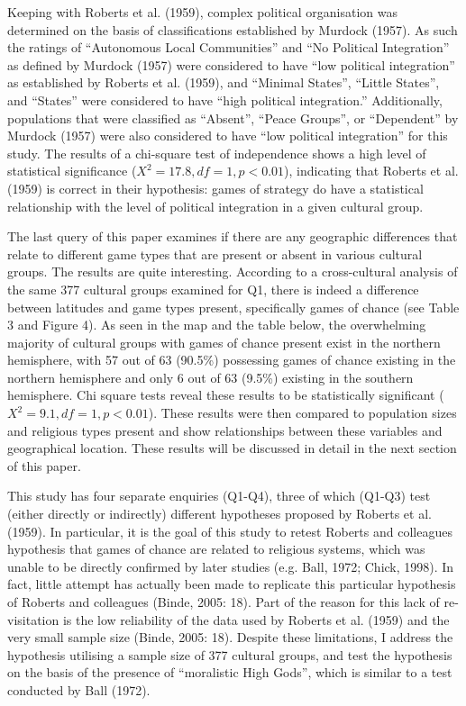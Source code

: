 \documentclass[%
	]{ijsra}
\begin{document}

Keeping with Roberts et al. (1959), complex political organisation was determined on the basis of classifications established by Murdock (1957). As such the ratings of “Autonomous Local Communities” and “No Political Integration” as defined by Murdock (1957) were considered to have “low political integration” as established by Roberts et al. (1959), and “Minimal States”, “Little States”, and “States” were considered to have “high political integration.” Additionally, populations that were classified as “Absent”, “Peace Groups”, or “Dependent” by Murdock (1957) were also considered to have “low political integration” for this study. The results of a chi-square test of independence shows a high level of statistical significance ($X^{2} = 17.8, df = 1, p < 0.01$), indicating that Roberts et al. (1959) is correct in their hypothesis: games of strategy do have a statistical relationship with the level of political integration in a given cultural group.


The last query of this paper examines if there are any geographic differences that relate to different game types that are present or absent in various cultural groups. The results are quite interesting. According to a cross-cultural analysis of the same 377 cultural groups examined for Q1, there is indeed a difference between latitudes and game types present, specifically games of chance (see Table 3 and Figure 4). As seen in the map and the table below, the overwhelming majority of cultural groups with games of chance present exist in the northern hemisphere, with 57 out of 63 (90.5\%) possessing games of chance existing in the northern hemisphere and only 6 out of 63 (9.5\%) existing in the southern hemisphere. Chi square tests reveal these results to be statistically significant ($X^{2} = 9.1, df = 1, p < 0.01$). These results were then compared to population sizes and religious types present and show relationships between these variables and geographical location. These results will be discussed in detail in the next section of this paper.




This study has four separate enquiries (Q1-Q4), three of which (Q1-Q3) test (either directly or indirectly) different hypotheses proposed by Roberts et al. (1959). In particular, it is the goal of this study to retest Roberts and colleagues hypothesis that games of chance are related to religious systems, which was unable to be directly confirmed by later studies (e.g. Ball, 1972; Chick, 1998). In fact, little attempt has actually been made to replicate this particular hypothesis of Roberts and colleagues (Binde, 2005: 18). Part of the reason for this lack of re-visitation is the low reliability of the data used by Roberts et al. (1959) and the very small sample size (Binde, 2005: 18). Despite these limitations, I address the hypothesis utilising a sample size of 377 cultural groups, and test the hypothesis on the basis of the presence of “moralistic High Gods”, which is similar to a test conducted by Ball (1972). 
\end{document}
